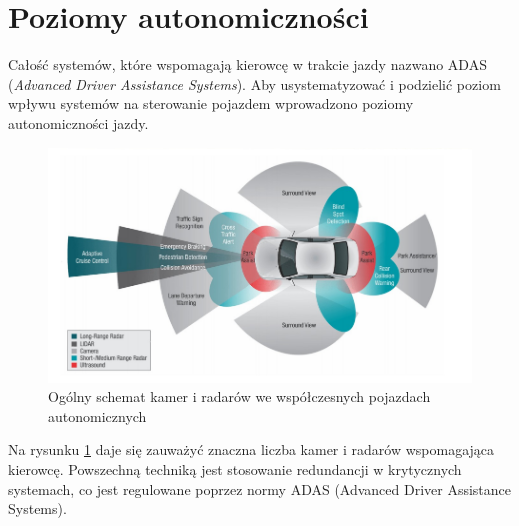 
\section{Poziomy autonomiczności}

Całość systemów, które wspomagają kierowcę w trakcie jazdy nazwano ADAS (\textit{Advanced Driver Assistance Systems}). 
Aby usystematyzować i podzielić poziom wpływu systemów na sterowanie pojazdem wprowadzono poziomy autonomiczności jazdy.

\begin{figure}
  \centering
  \includegraphics[width=13cm]{img/systemy_autonomiczne_ogolnie.png}
  \caption{Ogólny schemat kamer i radarów we współczesnych pojazdach autonomicznych\cite{S1}}
  \label{fig:kamery_i_radary}
\end{figure}

Na rysunku \ref{fig:kamery_i_radary} daje się zauważyć znaczna liczba kamer i radarów wspomagająca kierowcę. Powszechną techniką jest stosowanie redundancji w krytycznych systemach, co jest regulowane poprzez normy ADAS (Advanced Driver Assistance Systems).


